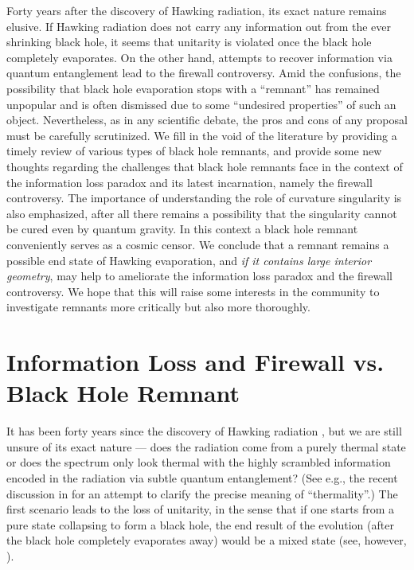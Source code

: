 \documentclass[12pt]{article}
\newcommand{\2}{$^2$}
\newcommand{\3}{$^3$}
\newcommand{\4}{$_4$}
\newcommand{\5}{$_5$}
\begin{document}
\medskip
Forty years after the discovery of Hawking radiation, its exact nature remains elusive. If Hawking radiation does not carry any information out from the ever shrinking black hole, it seems that unitarity is violated once the black hole completely evaporates. On the other hand, attempts to recover information via quantum entanglement lead to the firewall controversy. Amid the confusions, the possibility that black hole evaporation stops with a ``remnant'' has remained unpopular and is often dismissed due to some ``undesired properties'' of such an object. Nevertheless, as in any scientific debate, the pros and cons of any proposal must be carefully scrutinized. We fill in the void of the literature by providing a timely review of various types of black hole remnants, and provide some new thoughts regarding the challenges that black hole remnants face in the context of the information loss paradox and its latest incarnation, namely the firewall controversy. The importance of understanding the role of curvature singularity is also emphasized, after all there remains a possibility that the singularity cannot be cured even by quantum gravity. In this context a black hole remnant conveniently serves as a cosmic censor.  
We conclude that a remnant remains a possible end state of Hawking evaporation, and \emph{if it contains large interior geometry}, may help to ameliorate the information loss paradox and the firewall controversy.  
We hope that this will raise some interests in the community to investigate remnants more critically but also more thoroughly.


\newpage
\tableofcontents

\section{Information Loss and Firewall vs. Black Hole Remnant}


It has been forty years since the discovery of Hawking radiation \cite{Hawking1, Hawking2}, but we are still unsure of its exact nature --- does the radiation come from a purely thermal state or does the spectrum only look thermal with the highly scrambled information encoded in the radiation via subtle quantum entanglement? (See e.g., the recent discussion in \cite{visser01} for an attempt to clarify the precise meaning of ``thermality''.) The first scenario leads to the loss of unitarity, in the sense that if one starts from a pure state collapsing to form a black hole, the end result of the evolution (after the black hole completely evaporates away) would be a mixed state (see, however, \cite{myers01}).
\end{document}
